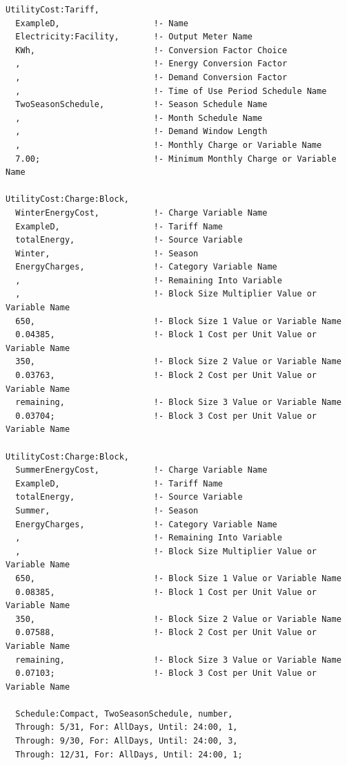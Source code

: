 \begin{lstlisting}
UtilityCost:Tariff,
  ExampleD,                   !- Name
  Electricity:Facility,       !- Output Meter Name
  KWh,                        !- Conversion Factor Choice
  ,                           !- Energy Conversion Factor
  ,                           !- Demand Conversion Factor
  ,                           !- Time of Use Period Schedule Name
  TwoSeasonSchedule,          !- Season Schedule Name
  ,                           !- Month Schedule Name
  ,                           !- Demand Window Length
  ,                           !- Monthly Charge or Variable Name
  7.00;                       !- Minimum Monthly Charge or Variable Name

UtilityCost:Charge:Block,
  WinterEnergyCost,           !- Charge Variable Name
  ExampleD,                   !- Tariff Name
  totalEnergy,                !- Source Variable
  Winter,                     !- Season
  EnergyCharges,              !- Category Variable Name
  ,                           !- Remaining Into Variable
  ,                           !- Block Size Multiplier Value or Variable Name
  650,                        !- Block Size 1 Value or Variable Name
  0.04385,                    !- Block 1 Cost per Unit Value or Variable Name
  350,                        !- Block Size 2 Value or Variable Name
  0.03763,                    !- Block 2 Cost per Unit Value or Variable Name
  remaining,                  !- Block Size 3 Value or Variable Name
  0.03704;                    !- Block 3 Cost per Unit Value or Variable Name

UtilityCost:Charge:Block,
  SummerEnergyCost,           !- Charge Variable Name
  ExampleD,                   !- Tariff Name
  totalEnergy,                !- Source Variable
  Summer,                     !- Season
  EnergyCharges,              !- Category Variable Name
  ,                           !- Remaining Into Variable
  ,                           !- Block Size Multiplier Value or Variable Name
  650,                        !- Block Size 1 Value or Variable Name
  0.08385,                    !- Block 1 Cost per Unit Value or Variable Name
  350,                        !- Block Size 2 Value or Variable Name
  0.07588,                    !- Block 2 Cost per Unit Value or Variable Name
  remaining,                  !- Block Size 3 Value or Variable Name
  0.07103;                    !- Block 3 Cost per Unit Value or Variable Name

  Schedule:Compact, TwoSeasonSchedule, number,
  Through: 5/31, For: AllDays, Until: 24:00, 1,
  Through: 9/30, For: AllDays, Until: 24:00, 3,
  Through: 12/31, For: AllDays, Until: 24:00, 1;
\end{lstlisting}

